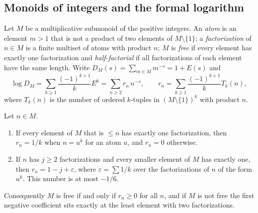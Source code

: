 \subsection{Monoids of integers and the formal logarithm}

Let $M$ be a multiplicative submonoid of the positive integers.
An \emph{atom} is an element $m>1$ that is not a product of two elements of $M\setminus\{1\}$; a \emph{factorization} of $n\in M$ is a finite multiset of atoms with product $n$; $M$ is \emph{free} if every element has exactly one factorization and \emph{half-factorial} if all factorizations of each element have the same length.
Write $D_M(s)=\sum_{m\in M}m^{-s}=1+E(s)$ and
\[
\log D_M=\sum_{k\ge1}\frac{(-1)^{k+1}}{k}E^k=\sum_{n\ge2}r_n\,n^{-s},\qquad r_n=\sum_{k\ge1}\frac{(-1)^{k+1}}{k}T_k(n),
\]
where $T_k(n)$ is the number of ordered $k$-tuples in $(M\setminus\{1\})^k$ with product $n$.

\begin{theorem}\label{thm:formallog}
Let $n\in M$.
\begin{enumerate}[label=(\alph*)]
\item If every element of $M$ that is $\le n$ has exactly one factorization, then $r_n=1/k$ when $n=u^k$ for an atom $u$, and $r_n=0$ otherwise.
\item If $n$ has $j\ge2$ factorizations and every smaller element of $M$ has exactly one, then $r_n=1-j+\varepsilon$, where $\varepsilon=\sum1/k$ over the factorizations of $n$ of the form $u^k$. This number is at most $-1/6$.
\end{enumerate}
Consequently $M$ is free if and only if $r_n\ge0$ for all $n$, and if $M$ is not free the first negative coefficient sits exactly at the least element with two factorizations.
\end{theorem}

